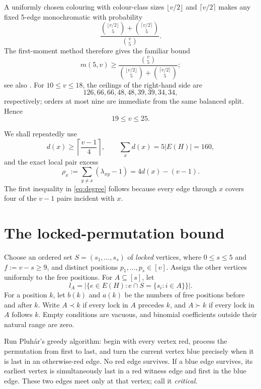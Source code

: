 \documentclass[11pt]{article}
\theoremstyle{remark}
\begin{document}
A uniformly chosen colouring with colour-class sizes
$\lfloor v/2\rfloor$ and $\lceil v/2\rceil$ makes any fixed 5-edge
monochromatic with probability
\[
\frac{\binom{\lfloor v/2\rfloor}5+\binom{\lceil v/2\rceil}5}
     {\binom v5}.
\]
The first-moment method therefore gives the familiar bound
\begin{equation}\label{eq:balanced}
m(5,v)\ge
\frac{\binom v5}
{\binom{\lfloor v/2\rfloor}5+\binom{\lceil v/2\rceil}5};
\end{equation}
see also \cite{GoldbergRussell1995,GrillLinzmayer2024}.  For
$10\le v\le18$, the ceilings of the right-hand side are
\[
126,66,66,48,48,39,39,34,34,
\]
respectively; orders at most nine are immediate from the same balanced
split.  Hence
\begin{equation}\label{eq:range-initial}
19\le v\le25.
\end{equation}

We shall repeatedly use
\begin{equation}\label{eq:degree}
d(x)\ge\left\lceil\frac{v-1}{4}\right\rceil,
\qquad
\sum_xd(x)=5|E(H)|=160,
\end{equation}
and the exact local pair excess
\begin{equation}\label{eq:rho}
\rho_x:=\sum_{y\ne x}(\lambda_{xy}-1)
=4d(x)-(v-1).
\end{equation}
The first inequality in \eqref{eq:degree} follows because every edge through
$x$ covers four of the $v-1$ pairs incident with $x$.

\section{The locked-permutation bound}\label{sec:locked}

Choose an ordered set $S=(s_1,\ldots,s_s)$ of \emph{locked} vertices, where
$0\le s\le5$ and $f:=v-s\ge9$, and distinct positions
$p_1,\ldots,p_s\in[v]$.  Assign the
other vertices uniformly to the free positions.  For $A\subseteq[s]$, let
\[
l_A=|\{e\in E(H):e\cap S=\{s_i:i\in A\}\}|.
\]
For a position $k$, let $b(k)$ and $a(k)$ be the numbers of free positions
before and after $k$.  Write $A\prec k$ if every lock in $A$ precedes $k$,
and $A\succ k$ if every lock in $A$ follows $k$.  Empty conditions are
vacuous, and binomial coefficients outside their natural range are zero.

Run Pluh\'ar's greedy algorithm: begin with every vertex red, process the
permutation from first to last, and turn the current vertex blue precisely
when it is last in an otherwise-red edge.  No red edge survives.  If a blue
edge survives, its earliest vertex is simultaneously last in a red witness
edge and first in the blue edge.  These two edges meet only at that vertex;
call it \emph{critical}.
\end{document}
